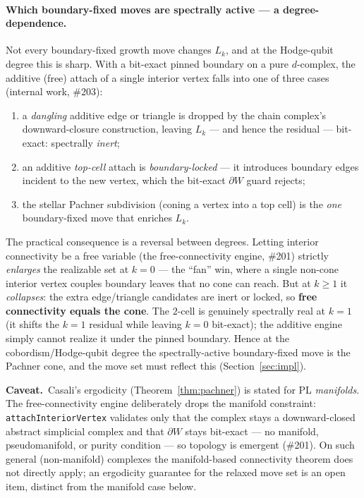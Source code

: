 \documentclass[11pt]{article}
\newcommand{\bd}{\partial}
\theoremstyle{definition}
\theoremstyle{plain}
\newcommand{\caveat}[1]{\par\noindent\textcolor{red!60!black}{\textbf{Caveat.}}\ #1\par}
\begin{document}
\paragraph{Which boundary-fixed moves are spectrally active --- a degree-dependence.}
Not every boundary-fixed growth move changes $L_k$, and at the Hodge-qubit degree this is
sharp. With a bit-exact pinned boundary on a pure $d$-complex, the additive (free) attach of
a single interior vertex falls into one of three cases (internal work, \#203):
\begin{enumerate}[label=(\roman*),leftmargin=2.4em]
\item a \emph{dangling} additive edge or triangle is dropped by the chain complex's
downward-closure construction, leaving $L_k$ --- and hence the residual --- bit-exact:
spectrally \emph{inert};
\item an additive \emph{top-cell} attach is \emph{boundary-locked} --- it introduces
boundary edges incident to the new vertex, which the bit-exact $\bd W$ guard rejects;
\item the stellar Pachner subdivision (coning a vertex into a top cell) is the \emph{one}
boundary-fixed move that enriches $L_k$.
\end{enumerate}
The practical consequence is a reversal between degrees. Letting interior connectivity be a
free variable (the free-connectivity engine, \#201) strictly \emph{enlarges} the realizable
set at $k=0$ --- the ``fan'' win, where a single non-cone interior vertex couples boundary
leaves that no cone can reach. But at $k\ge1$ it \emph{collapses}: the extra
edge/triangle candidates are inert or locked, so \textbf{free connectivity equals the cone}.
The $2$-cell is genuinely spectrally real at $k=1$ (it shifts the $k=1$ residual while
leaving $k=0$ bit-exact); the additive engine simply cannot realize it under the pinned
boundary. Hence at the cobordism/Hodge-qubit degree the spectrally-active boundary-fixed
move is the Pachner cone, and the move set must reflect this (Section~\ref{sec:impl}).

\caveat{Casali's ergodicity (Theorem~\ref{thm:pachner}) is stated for PL \emph{manifolds}.
The free-connectivity engine deliberately drops the manifold constraint: \texttt{attach\-Interior\-Vertex}
validates only that the complex stays a downward-closed abstract simplicial complex and that
$\bd W$ stays bit-exact --- no manifold, pseudomanifold, or purity condition --- so topology
is emergent (\#201). On such general (non-manifold) complexes the manifold-based connectivity
theorem does not directly apply; an ergodicity guarantee for the relaxed move set is an open
item, distinct from the manifold case below.}
\end{document}
